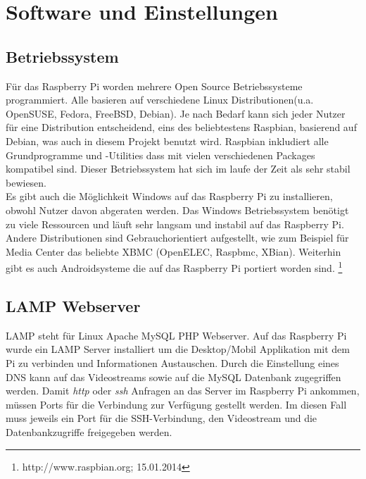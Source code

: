\section{Software und Einstellungen}

\subsection{Betriebssystem}
Für das Raspberry Pi worden mehrere Open Source Betriebssysteme programmiert. Alle basieren auf verschiedene Linux Distributionen(u.a. OpenSUSE, Fedora, FreeBSD, Debian). Je nach Bedarf kann sich jeder Nutzer für eine Distribution entscheidend, eins des beliebtestens Raspbian, basierend auf Debian, was auch in diesem Projekt benutzt wird. Raspbian inkludiert alle Grundprogramme und -Utilities dass mit vielen verschiedenen Packages kompatibel sind. Dieser Betriebssystem hat sich im laufe der Zeit als sehr stabil bewiesen.\\

Es gibt auch die Möglichkeit Windows auf das Raspberry Pi zu installieren, obwohl Nutzer davon abgeraten werden. Das Windows Betriebssystem benötigt zu viele Ressourcen und läuft sehr langsam und instabil auf das Raspberry Pi.\\

Andere Distributionen sind Gebrauchorientiert aufgestellt, wie zum Beispiel für Media Center das beliebte XBMC (OpenELEC, Raspbmc, XBian). Weiterhin gibt es auch Androidsysteme die auf das Raspberry Pi portiert worden sind.
\footnote{http://www.raspbian.org; 15.01.2014}


\subsection{LAMP Webserver}
LAMP steht für Linux Apache MySQL PHP Webserver. Auf das Raspberry Pi wurde ein LAMP Server installiert um die Desktop/Mobil Applikation mit dem Pi zu verbinden und Informationen Austauschen. Durch die Einstellung eines DNS kann auf das Videostreams sowie auf die MySQL Datenbank zugegriffen werden. Damit \textit{http} oder \textit{ssh} Anfragen  an das Server im Raspberry Pi ankommen, müssen Ports für die Verbindung zur Verfügung gestellt werden. Im diesen Fall muss jeweils ein Port für die SSH-Verbindung, den Videostream und die Datenbankzugriffe freigegeben werden.\\

